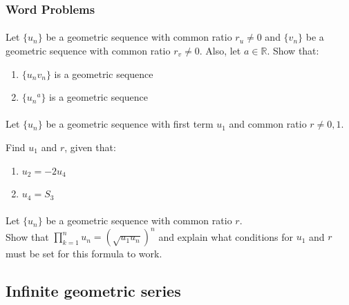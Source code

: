 \documentclass[12pt, a4paper, titlepage, twoside]{article}
\newcommand*{\R}{\mathbb{R}}
\begin{document}
	\hfill
	
	\subsubsection*{Word Problems}
	
	\paragraph{}
	 Let $\{u_n\}$ be a geometric sequence with common ratio $r_u \neq 0$ and
	$\{v_n\}$ be a geometric sequence with common ratio $r_v \neq 0$. Also, let $a \in \R$. Show that:
	
	\begin{enumerate}[label=\textbf{(\alph*)}]
		\item $\{u_n v_n\}$ is a geometric sequence
		\item $\{{u_n}^a\}$ is a geometric sequence
	\end{enumerate}
	
	\paragraph{}
	 Let $\{u_n\}$ be a geometric sequence with first term $u_1$ and common ratio $r \neq 0,1$.
	
	Find $u_1$ and $r$, given that:
	
	\begin{enumerate}[label=\textbf{(\alph*)}]
		\item $u_2 = -2u_4$
		\item $u_4 = S_3$
	\end{enumerate}
	
	\paragraph{}
	 Let $\{u_n\}$ be a geometric sequence with common ratio $r$.\\
	
	Show that $\displaystyle \prod_{k=1}^n u_n = (\sqrt{u_1 u_n})^n$ and explain what conditions for $u_1$ and $r$ must be
	set for this formula to work.\\
	
	\newpage	
	
	\subsection{Infinite geometric series}
\end{document}
